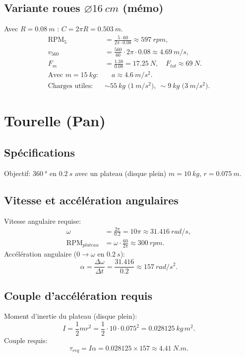 \documentclass[11pt,a4paper]{article}
\begin{document}
\subsection{Variante roues \(\varnothing\SI{16}{cm}\) (mémo)}
Avec \(R=\SI{0.08}{m}\) : \(C=2\pi R=\SI{0.503}{m}\).
\begin{align}
\mathrm{RPM}_5&=\frac{5\cdot 60}{2\pi\cdot 0.08}\approx \boxed{\SI{597}{rpm}},\\
v_{560}&=\frac{560}{60}\cdot 2\pi\cdot 0.08\approx \boxed{\SI{4.69}{m/s}},\\
F_m&=\frac{1.38}{0.08}=\SI{17.25}{N},\quad F_{tot}\approx \SI{69}{N}.\\
\text{Avec } m=\SI{15}{kg}:&\quad a\approx \SI{4.6}{m/s^2}.\\
\text{Charges utiles: }&\sim \SI{55}{kg} \text{ (}\SI{1}{m/s^2}\text{)},\ \sim \SI{9}{kg} \text{ (}\SI{3}{m/s^2}\text{)}.
\end{align}

\section{Tourelle (Pan)}
\subsection{Spécifications}
Objectif: \(\SI{360}{\degree}\) en \(\SI{0.2}{s}\) avec un plateau (disque plein) \(m=\SI{10}{kg}\), \(r=\SI{0.075}{m}\).

\subsection{Vitesse et accélération angulaires}
Vitesse angulaire requise:
\begin{align}
\omega &= \frac{2\pi}{0.2}=10\pi \approx \boxed{\SI{31.416}{rad/s}},\\
\mathrm{RPM}_{plateau}&=\omega\cdot \frac{60}{2\pi}\approx \boxed{\SI{300}{rpm}}.
\end{align}
Accélération angulaire (0\(\rightarrow\)\(\omega\) en \(\SI{0.2}{s}\)):
\begin{equation}
\alpha=\frac{\Delta \omega}{\Delta t}=\frac{31.416}{0.2}\approx \boxed{\SI{157}{rad/s^2}}.
\end{equation}

\subsection{Couple d'accélération requis}
Moment d'inertie du plateau (disque plein):
\begin{equation}
I=\frac{1}{2}mr^2=\frac{1}{2}\cdot 10 \cdot 0.075^2=\SI{0.028125}{kg\,m^2}.
\end{equation}
Couple requis:
\begin{equation}
\tau_{req}=I\alpha=0.028125\times 157 \approx \boxed{\SI{4.41}{N.m}}.
\end{equation}
\end{document}
